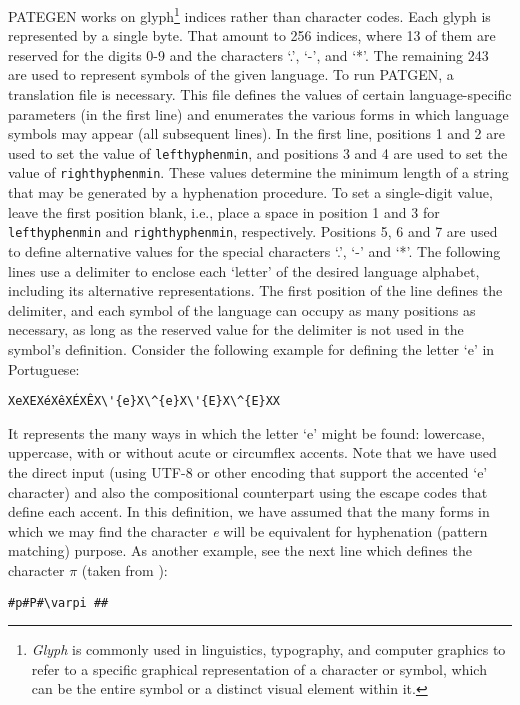 \documentclass{article}
\begin{document}
PATEGEN works on glyph\footnote{\emph{Glyph} is commonly used in linguistics,
typography, and computer graphics to refer to a specific graphical
representation of a character or symbol, which can be the entire symbol or a
distinct visual element within it.} indices rather than character codes. Each
glyph is represented by a single byte. That amount to 256 indices, where 13 of
them are reserved for the digits 0-9 and the characters `.', `-', and `*'. The
remaining 243 are used to represent symbols of the given language.  To run
PATGEN, a translation file is necessary. This file defines the values of
certain language-specific parameters (in the first line) and enumerates the
various forms in which language symbols may appear (all subsequent lines).  In
the first line, positions 1 and 2 are used to set the value of
\verb|lefthyphenmin|, and positions 3 and 4 are used to set the value of
\verb|righthyphenmin|.  These values determine the minimum length of a string
that may be generated by a hyphenation procedure. To set a single-digit value,
leave the first position blank, i.e., place a space in position 1 and 3 for
\verb|lefthyphenmin| and \verb|righthyphenmin|, respectively.  Positions 5, 6
and 7 are used to define alternative values for the special characters `.', `-'
and `*'.  The following lines use a delimiter to enclose each `letter' of the
desired language alphabet, including its alternative representations.  The
first position of the line defines the delimiter, and each symbol of the
language can occupy as many positions as necessary, as long as the reserved
value for the delimiter is not used in the symbol's definition.  Consider the
following example for defining the letter `e' in Portuguese: 
\begin{verbatim}
XeXEXéXêXÉXÊX\'{e}X\^{e}X\'{E}X\^{E}XX 
\end{verbatim}
It represents the many ways in which the letter `e' might be found: lowercase,
uppercase, with or without acute or circumflex accents. Note that we have used
the direct input (using UTF-8 or other encoding that support the accented `e'
character) and also the compositional counterpart using the escape codes that
define each accent.  In this definition, we have assumed that the many forms in
which we may find the character \emph{e} will be equivalent for
hyphenation (pattern matching) purpose. As another example, see the next line
which defines the character $\pi$ (taken from \textcite{haralambous2021}):
\begin{verbatim} 
#p#P#\varpi ## 
\end{verbatim}
\end{document}
